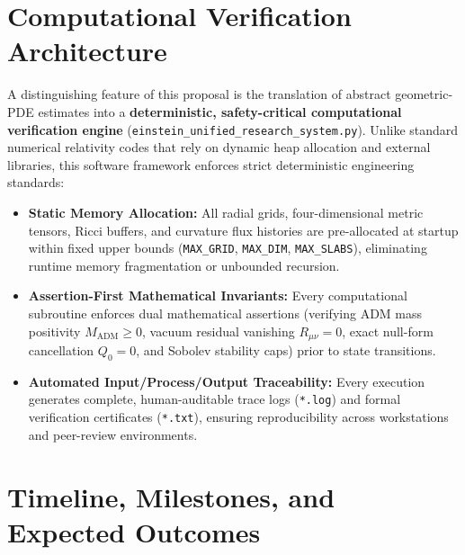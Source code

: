 \documentclass[11pt, a4paper]{article}
\begin{document}
\section{Computational Verification Architecture}

A distinguishing feature of this proposal is the translation of abstract geometric-PDE estimates into a \textbf{deterministic, safety-critical computational verification engine} (\texttt{einstein\_unified\_research\_system.py}). Unlike standard numerical relativity codes that rely on dynamic heap allocation and external libraries, this software framework enforces strict deterministic engineering standards:

\begin{itemize}
    \item \textbf{Static Memory Allocation:} All radial grids, four-dimensional metric tensors, Ricci buffers, and curvature flux histories are pre-allocated at startup within fixed upper bounds (\texttt{MAX\_GRID}, \texttt{MAX\_DIM}, \texttt{MAX\_SLABS}), eliminating runtime memory fragmentation or unbounded recursion.
    \item \textbf{Assertion-First Mathematical Invariants:} Every computational subroutine enforces dual mathematical assertions (verifying ADM mass positivity $M_{\mathrm{ADM}} \ge 0$, vacuum residual vanishing $R_{\mu\nu} = 0$, exact null-form cancellation $Q_0 = 0$, and Sobolev stability caps) prior to state transitions.
    \item \textbf{Automated Input/Process/Output Traceability:} Every execution generates complete, human-auditable trace logs (\texttt{*.log}) and formal verification certificates (\texttt{*.txt}), ensuring reproducibility across workstations and peer-review environments.
\end{itemize}

\section{Timeline, Milestones, and Expected Outcomes}
\end{document}
